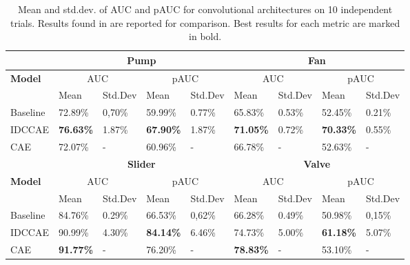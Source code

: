 \begin{table}[ht]
\small
\centering
\begin{tabular}{|m{1.8cm}|m{1.3cm}|m{1.25cm}|m{1.3cm}|m{1.25cm}|m{1.3cm}|m{1.25cm}|m{1.3cm}|m{1.25cm}|} 
\cline{2-9}
\multicolumn{1}{c|}{} & \multicolumn{4}{c|}{\textbf{Pump}} & \multicolumn{4}{c|}{\textbf{Fan}} \\ 
\hline
\multirow{2}{*}{\textbf{Model}} & \multicolumn{2}{c|}{AUC} & \multicolumn{2}{c|}{pAUC} & \multicolumn{2}{c|}{AUC} & \multicolumn{2}{c|}{pAUC} \\ 
\cline{2-9}
 & Mean & Std.Dev & Mean & Std.Dev & Mean & Std.Dev & Mean & Std.Dev \\ 
\hline
Baseline & 72.89\% & 0,70\%~ & 59.99\% & 0.77\% & 65.83\% & 0.53\% & 52.45\% & 0.21\% \\ 
\hline
IDCCAE & \textbf{76.63\%} & 1.87\% & \textbf{67.90\%} & 1.87\% & \textbf{71.05\%} & 0.72\% & \textbf{70.33\%} & 0.55\% \\ 
\hline
CAE \cite{15DeepDenseConvAE} & 72.07\% & - & 60.96\% & - & 66.78\% & - & 52.63\% & - \\ 
\hline
\multicolumn{1}{c|}{} & \multicolumn{4}{c|}{\textbf{Slider}} & \multicolumn{4}{c|}{\textbf{Valve}} \\ 
\hline
\multirow{2}{*}{\textbf{Model}} & \multicolumn{2}{c|}{AUC} & \multicolumn{2}{c|}{pAUC} & \multicolumn{2}{c|}{AUC} & \multicolumn{2}{c|}{pAUC} \\ 
\cline{2-9}
 & Mean & Std.Dev & Mean & Std.Dev & Mean & Std.Dev & Mean & Std.Dev \\ 
\hline
Baseline & 84.76\% & 0.29\% & 66.53\% & 0,62\%~ & 66.28\% & 0.49\% & 50.98\% & 0,15\%~ \\ 
\hline
IDCCAE & 90.99\% & 4.30\% & \textbf{84.14\%} & 6.46\% & 74.73\% & 5.00\% & \textbf{61.18\%} & 5.07\% \\ 
\hline
CAE \cite{15DeepDenseConvAE} & \textbf{91.77\%} & - & 76.20\% & - & \textbf{78.83\%} & - & 53.10\% & - \\
\hline
\end{tabular}
\caption{ Mean and std.dev. of AUC and pAUC for convolutional architectures on 10 independent trials. Results found in \cite{15DeepDenseConvAE} are reported for comparison. Best results for each metric are marked in bold.}
\label{table-conv-results}
\end{table}

